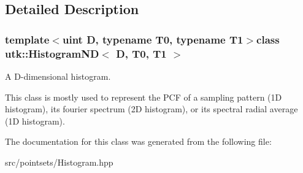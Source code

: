\subsection{Detailed Description}
\subsubsection*{template$<$uint D, typename T0, typename T1$>$class utk\-::\-Histogram\-N\-D$<$ D, T0, T1 $>$}

A D-\/dimensional histogram. 

This class is mostly used to represent the P\-C\-F of a sampling pattern (1\-D histogram), its fourier spectrum (2\-D histogram), or its spectral radial average (1\-D histogram). 

The documentation for this class was generated from the following file\-:\begin{DoxyCompactItemize}
\item 
src/pointsets/Histogram.\-hpp\end{DoxyCompactItemize}
